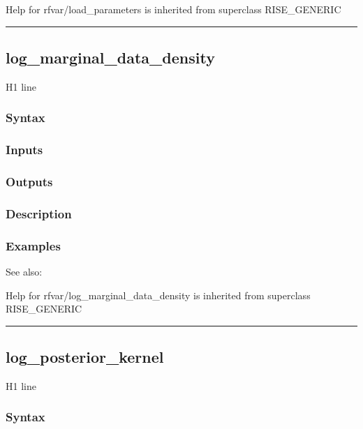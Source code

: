 \documentclass[letterpaper,10pt,english]{sphinxmanual}
\begin{document}
Help for rfvar/load\_parameters is inherited from superclass RISE\_GENERIC


\bigskip\hrule{}\bigskip



\subsection{log\_marginal\_data\_density}
\label{classes/models/@rfvar/rfvar:id56}\label{classes/models/@rfvar/rfvar:log-marginal-data-density}
H1 line


\subsubsection{Syntax}
\label{classes/models/@rfvar/rfvar:id57}

\subsubsection{Inputs}
\label{classes/models/@rfvar/rfvar:id58}

\subsubsection{Outputs}
\label{classes/models/@rfvar/rfvar:id59}

\subsubsection{Description}
\label{classes/models/@rfvar/rfvar:id60}

\subsubsection{Examples}
\label{classes/models/@rfvar/rfvar:id61}
See also:

Help for rfvar/log\_marginal\_data\_density is inherited from superclass RISE\_GENERIC


\bigskip\hrule{}\bigskip



\subsection{log\_posterior\_kernel}
\label{classes/models/@rfvar/rfvar:log-posterior-kernel}\label{classes/models/@rfvar/rfvar:id62}
H1 line


\subsubsection{Syntax}
\label{classes/models/@rfvar/rfvar:id63}
\end{document}
